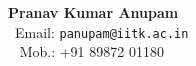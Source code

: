 \documentclass[12pt,a4paper]{article}
\begin{document}
{\LARGE\bf{Pranav Kumar Anupam}}\\
~Email: \texttt{\large panupam@iitk.ac.in}\\
~	Mob.: +91 89872 01180\\
\end{document}
